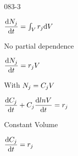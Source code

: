 \begin{mitframe}{083-3}
 \begin{listone}
	\item $\dfrac{\mathrm{d}\massspecflux{j}}{\mathrm{d}\timet}=\int_{\vol}\pos_j\mathrm{d}\vol$
    		\begin{listtwo}
            	\item No partial dependence
                	\begin{listthree}
                    	\item $\dfrac{\mathrm{d}\massspecflux{j}}{\mathrm{d}\timet}=\pos_j\vol$
                        \item With $\massspecflux{j}=\conc_j\vol$
                        	\begin{listfour}
                            	\item $\dfrac{\mathrm{d}\conc_j}{\mathrm{d}\timet}+\conc_j\dfrac{\mathrm{d}ln\vol}{\mathrm{d}\timet}=\pos_j$
                                	\begin{listfive}
                                    	\item Constant Volume
                                        \begin{listsix}
                                        	\item $\dfrac{\mathrm{d}\conc_j}{\mathrm{d}\timet}=\pos_j$

										\end{listsix}
                                    \end{listfive}
                            \end{listfour}                    	                    \end{listthree}
            \end{listtwo}
\end{listone}   
\end{mitframe}